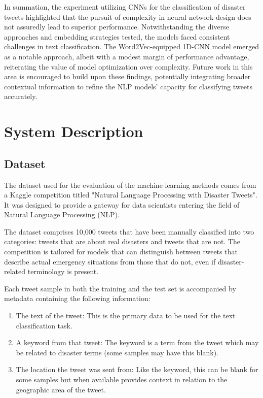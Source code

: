 \documentclass[10pt,table]{article}
\begin{document}
In summation, the experiment utilizing CNNs for the classification of disaster tweets highlighted that the pursuit of complexity in neural network design does not assuredly lead to superior performance. Notwithstanding the diverse approaches and embedding strategies tested, the models faced consistent challenges in text classification. The Word2Vec-equipped 1D-CNN model emerged as a notable approach, albeit with a modest margin of performance advantage, reiterating the value of model optimization over complexity. Future work in this area is encouraged to build upon these findings, potentially integrating broader contextual information to refine the NLP models' capacity for classifying tweets accurately.

\section{System Description}


\subsection{Dataset}
The dataset used for the evaluation of the machine-learning methods comes from a Kaggle competition titled "Natural Language Processing with Disaster Tweets". It was designed to provide a gateway for data scientists entering the field of Natural Language Processing (NLP). 

The dataset comprises 10,000 tweets that have been manually classified into two categories: tweets that are about real disasters and tweets that are not. The competition is tailored for models that can distinguish between tweets that describe actual emergency situations from those that do not, even if disaster-related terminology is present. 

Each tweet sample in both the training and the test set is accompanied by metadata containing the following information:

\begin{enumerate}
    \item  The text of the tweet: This is the primary data to be used for the text classification task.
    \item A keyword from that tweet: The keyword is a term from the tweet which may be related to disaster terms (some samples may have this blank).
    \item The location the tweet was sent from: Like the keyword, this can be blank for some samples but when available provides context in relation to the geographic area of the tweet.
\end{enumerate}
\end{document}
